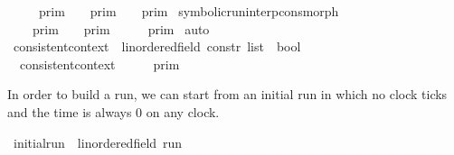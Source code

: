 \begin{isabellebody}
{\isacharbar}\ {\isacartoucheopen}{\isasymlbrakk}{\isasymlbrakk}\ {\isasymgamma}\ {\isacharhash}\ {\isasymGamma}\ {\isasymrbrakk}{\isasymrbrakk}\isactrlsub p\isactrlsub r\isactrlsub i\isactrlsub m\ {\isacharequal}\ {\isasymlbrakk}\ {\isasymgamma}\ {\isasymrbrakk}\isactrlsub p\isactrlsub r\isactrlsub i\isactrlsub m\ {\isasyminter}\ {\isasymlbrakk}{\isasymlbrakk}\ {\isasymGamma}\ {\isasymrbrakk}{\isasymrbrakk}\isactrlsub p\isactrlsub r\isactrlsub i\isactrlsub m{\isacartoucheclose}\isanewline
\isanewline
{}\isamarkupfalse%
\ symbolic{\isacharunderscore}run{\isacharunderscore}interp{\isacharunderscore}cons{\isacharunderscore}morph{\isacharcolon}\isanewline
\ \ {\isacartoucheopen}{\isasymlbrakk}\ {\isasymgamma}\ {\isasymrbrakk}\isactrlsub p\isactrlsub r\isactrlsub i\isactrlsub m\ {\isasyminter}\ {\isasymlbrakk}{\isasymlbrakk}\ {\isasymGamma}\ {\isasymrbrakk}{\isasymrbrakk}\isactrlsub p\isactrlsub r\isactrlsub i\isactrlsub m\ {\isacharequal}\ {\isasymlbrakk}{\isasymlbrakk}\ {\isasymgamma}\ {\isacharhash}\ {\isasymGamma}\ {\isasymrbrakk}{\isasymrbrakk}\isactrlsub p\isactrlsub r\isactrlsub i\isactrlsub m{\isacartoucheclose}\isanewline
%
\isadelimproof
%
\endisadelimproof
%
\isatagproof
{}\isamarkupfalse%
\ auto%
\endisatagproof
{\isafoldproof}%
%
\isadelimproof
\isanewline
%
\endisadelimproof
\isanewline
{}\isamarkupfalse%
\ consistent{\isacharunderscore}context\ {\isacharcolon}{\isacharcolon}\ {\isacartoucheopen}{\isacharparenleft}{\isacharprime}{\isasymtau}{\isacharcolon}{\isacharcolon}linordered{\isacharunderscore}field{\isacharparenright}\ constr\ list\ {\isasymRightarrow}\ bool{\isacartoucheclose}\isanewline
{}\ \isanewline
\ \ {\isacartoucheopen}consistent{\isacharunderscore}context\ {\isasymGamma}\ {\isasymequiv}\ {\isacharparenleft}\ {\isasymlbrakk}{\isasymlbrakk}\ {\isasymGamma}\ {\isasymrbrakk}{\isasymrbrakk}\isactrlsub p\isactrlsub r\isactrlsub i\isactrlsub m\ {\isasymnoteq}\ {\isacharbraceleft}{\isacharbraceright}{\isacharparenright}\ {\isacartoucheclose}%
\isadelimdocument
%
\endisadelimdocument
%
\isatagdocument
%
\isamarkuptrue%
%
\endisatagdocument
{\isafolddocument}%
%
\isadelimdocument
%
\endisadelimdocument
%
\begin{isamarkuptext}%
In order to build a run, we can start from an initial run in which no clock 
  ticks and the time is always 0 on any clock.%
\end{isamarkuptext}\isamarkuptrue%
\isamarkupfalse%
\ initial{\isacharunderscore}run\ {\isacharcolon}{\isacharcolon}\ {\isacartoucheopen}{\isacharparenleft}{\isacharprime}{\isasymtau}{\isacharcolon}{\isacharcolon}linordered{\isacharunderscore}field{\isacharparenright}\ run{\isacartoucheclose}\ {\isacharparenleft}{\isacartoucheopen}{\isasymrho}\isactrlsub {\isasymodot}{\isacartoucheclose}{\isacharparenright}\ \isanewline

\end{isabellebody}
